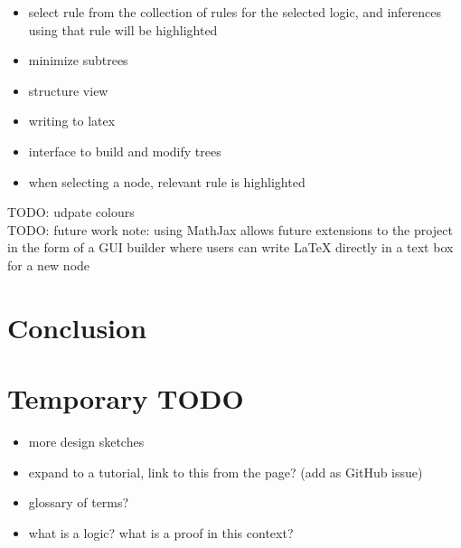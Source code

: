 \documentclass[conference]{IEEEtran}
\begin{document}
\begin{itemize}
    \item select rule from the collection of rules for the selected logic, and inferences using that rule will be highlighted
    \item minimize subtrees
    \item structure view
    \item writing to latex
    \item interface to build and modify trees
    \item when selecting a node, relevant rule is highlighted
\end{itemize}

TODO: udpate colours \\

TODO: future work note: using MathJax allows future extensions to the project in the form of a GUI builder where users can write LaTeX directly in a text box for a new node \\

\section{Conclusion}



\section{Temporary TODO}

\begin{itemize}
\item more design sketches
\item expand to a tutorial, link to this from the page? (add as GitHub issue)
\item glossary of terms?
\item what is a logic? what is a proof in this context?
\end{itemize}



\end{document}
